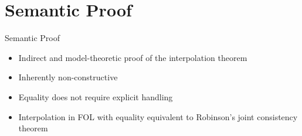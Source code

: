 \documentclass[final,compress]{beamer}
\begin{document}
\section{Semantic Proof}
\begin{frame}{Semantic Proof}
	\begin{itemize}
		\item Indirect and model-theoretic proof of the interpolation theorem

		\item Inherently non-constructive 

		\item Equality does not require explicit handling

		\item Interpolation in FOL with equality equivalent to Robinson's joint consistency theorem

	\end{itemize}




\end{frame}
\end{document}
